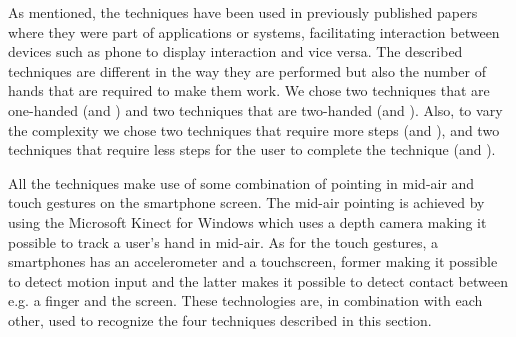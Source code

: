 As mentioned, the techniques have been used in previously published papers where they were part of applications or systems, facilitating interaction between devices such as phone to display interaction and vice versa. 
The described techniques are different in the way they are performed but also the number of hands that are required to make them work.
We chose two techniques that are one-handed (\swipe and \tilt) and two techniques that are two-handed (\throw and \pinch).
Also, to vary the complexity we chose two techniques that require more steps (\throw and \pinch), and two techniques that require less steps for the user to complete the technique (\swipe and \tilt).

All the techniques make use of some combination of pointing in mid-air and touch gestures on the smartphone screen.
The mid-air pointing is achieved by using the Microsoft Kinect for Windows which uses a depth camera making it possible to track a user's hand in mid-air.
As for the touch gestures, a smartphones has an accelerometer and a touchscreen, former making it possible to detect motion input and the latter makes it possible to detect contact between e.g. a finger and the screen.
These technologies are, in combination with each other, used to recognize the four techniques described in this section. 